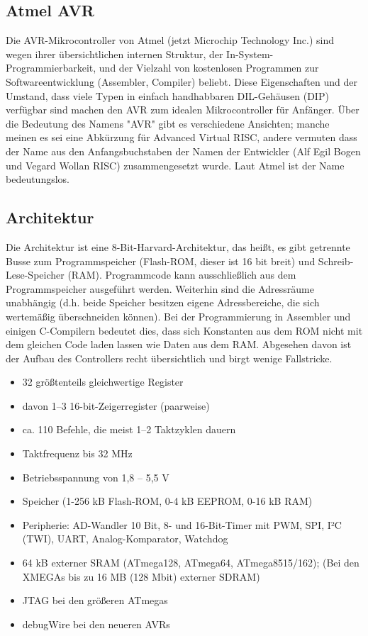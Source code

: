 \subsection{Atmel AVR}
Die AVR-Mikrocontroller von Atmel (jetzt Microchip Technology Inc.) sind wegen ihrer übersichtlichen internen Struktur, der In-System-Programmierbarkeit, und der Vielzahl von kostenlosen Programmen zur Softwareentwicklung (Assembler, Compiler) beliebt. Diese Eigenschaften und der Umstand, dass viele Typen in einfach handhabbaren DIL-Gehäusen (DIP) verfügbar sind  machen den AVR zum idealen Mikrocontroller für Anfänger.
Über die Bedeutung des Namens "AVR" gibt es verschiedene Ansichten; manche meinen es sei eine Abkürzung für Advanced Virtual RISC, andere vermuten dass der Name aus den Anfangsbuchstaben der Namen der Entwickler (Alf Egil Bogen und Vegard Wollan RISC) zusammengesetzt wurde. Laut Atmel ist der Name bedeutungslos.

\subsection{Architektur}
Die Architektur ist eine 8-Bit-Harvard-Architektur, das heißt, es gibt getrennte Busse zum Programmspeicher (Flash-ROM, dieser ist 16 bit breit) und Schreib-Lese-Speicher (RAM). Programmcode kann ausschließlich aus dem Programmspeicher ausgeführt werden. Weiterhin sind die Adressräume unabhängig (d.h. beide Speicher besitzen eigene Adressbereiche, die sich wertemäßig überschneiden können). Bei der Programmierung in Assembler und einigen C-Compilern bedeutet dies, dass sich Konstanten aus dem ROM nicht mit dem gleichen Code laden lassen wie Daten aus dem RAM. Abgesehen davon ist der Aufbau des Controllers recht übersichtlich und birgt wenige Fallstricke.
\begin{itemize}
\item 32 größtenteils gleichwertige Register
\item davon 1–3 16-bit-Zeigerregister (paarweise)
\item ca. 110 Befehle, die meist 1–2 Taktzyklen dauern
\item Taktfrequenz bis 32 MHz
\item Betriebsspannung von 1,8 – 5,5 V
\item Speicher (1-256 kB Flash-ROM, 0-4 kB EEPROM, 0-16 kB RAM)
\item Peripherie: AD-Wandler 10 Bit, 8- und 16-Bit-Timer mit PWM, SPI, I²C (TWI), UART, Analog-Komparator, Watchdog
\item 64 kB externer SRAM (ATmega128, ATmega64, ATmega8515/162); (Bei den XMEGAs bis zu 16 MB (128 Mbit) externer SDRAM)
\item JTAG bei den größeren ATmegas
\item debugWire bei den neueren AVRs		
\end{itemize}
\cite[Architektur]{mikrocontroller-avr}

